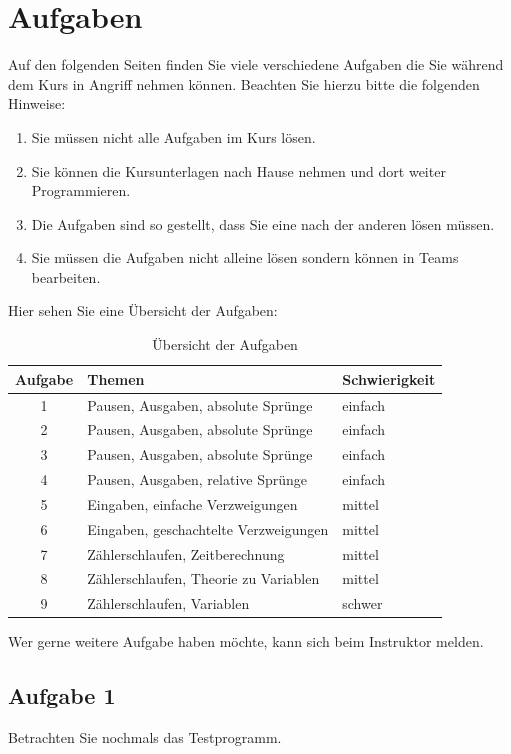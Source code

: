 
\section{Aufgaben}
Auf den folgenden Seiten finden Sie viele verschiedene Aufgaben die
Sie während dem Kurs in Angriff nehmen können. Beachten Sie hierzu 
bitte die folgenden Hinweise:

\begin{enumerate}
\item Sie müssen nicht alle Aufgaben im Kurs lösen.
\item Sie können die Kursunterlagen nach Hause nehmen und dort weiter Programmieren. 
\item Die Aufgaben sind so gestellt, dass Sie eine nach der anderen lösen 
müssen. 
\item Sie müssen die Aufgaben nicht alleine lösen sondern können in Teams bearbeiten.
\end{enumerate}

\noindent
Hier sehen Sie eine Übersicht der Aufgaben:

\begin{table}[h!]
\centering
\begin{tabular}{cll}
\textbf{Aufgabe} & \textbf{Themen} & \textbf{Schwierigkeit} \\ 
\hline
1 & Pausen, Ausgaben, absolute Sprünge & einfach \\ 
2 & Pausen, Ausgaben, absolute Sprünge & einfach \\ 
3 & Pausen, Ausgaben, absolute Sprünge & einfach \\ 
4 & Pausen, Ausgaben, relative Sprünge & einfach \\ 
5 & Eingaben, einfache Verzweigungen & mittel \\ 
6 & Eingaben, geschachtelte Verzweigungen & mittel \\ 
7 & Zählerschlaufen, Zeitberechnung & mittel  \\ 
8 & Zählerschlaufen, Theorie zu Variablen & mittel \\ 
9 & Zählerschlaufen, Variablen & schwer \\ 
\end{tabular} 
\caption{Übersicht der Aufgaben}
\end{table}

\noindent
Wer gerne weitere Aufgabe haben möchte, kann sich beim Instruktor melden.

\newpage
\subsection{Aufgabe 1}
Betrachten Sie nochmals das Testprogramm.


